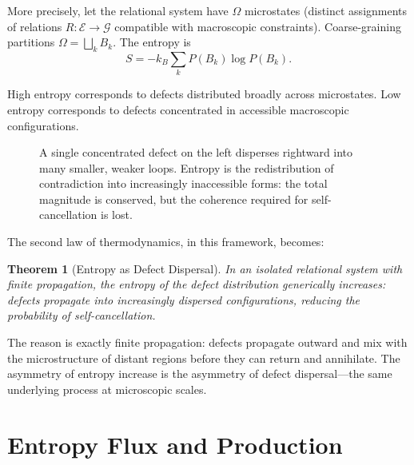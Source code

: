 \documentclass[12pt,a4paper,openany]{book}
\theoremstyle{plain}
\newtheorem{theorem}{Theorem}[chapter]
\theoremstyle{definition}
\theoremstyle{remark}
\newcommand{\GG}{\mathcal{G}}
\newcommand{\EE}{\mathcal{E}}
\newcommand{\Entropy}{S}
\begin{document}
More precisely, let the relational system have $\Omega$ microstates (distinct assignments of relations $R : \EE \to \GG$ compatible with macroscopic constraints). Coarse-graining partitions $\Omega = \bigsqcup_k B_k$. The entropy is
\[
\Entropy = -k_B \sum_k P(B_k) \log P(B_k).
\]

High entropy corresponds to defects distributed broadly across microstates. Low entropy corresponds to defects concentrated in accessible macroscopic configurations.

\begin{figure}[h]
\centering
{}
\caption[Entropy-dispersal glyph, Chapter~7]{A single concentrated defect on the left disperses rightward into many smaller, weaker loops. Entropy is the redistribution of contradiction into increasingly inaccessible forms: the total magnitude is conserved, but the coherence required for self-cancellation is lost.}
\label{fig:glyph_entropy}
\end{figure}

The second law of thermodynamics, in this framework, becomes:

\begin{theorem}[Entropy as Defect Dispersal]
In an isolated relational system with finite propagation, the entropy of the defect distribution generically increases: defects propagate into increasingly dispersed configurations, reducing the probability of self-cancellation.
\end{theorem}

The reason is exactly finite propagation: defects propagate outward and mix with the microstructure of distant regions before they can return and annihilate. The asymmetry of entropy increase is the asymmetry of defect dispersal---the same underlying process at microscopic scales.

\section{Entropy Flux and Production}
\label{sec:entropy_flux}
\end{document}
